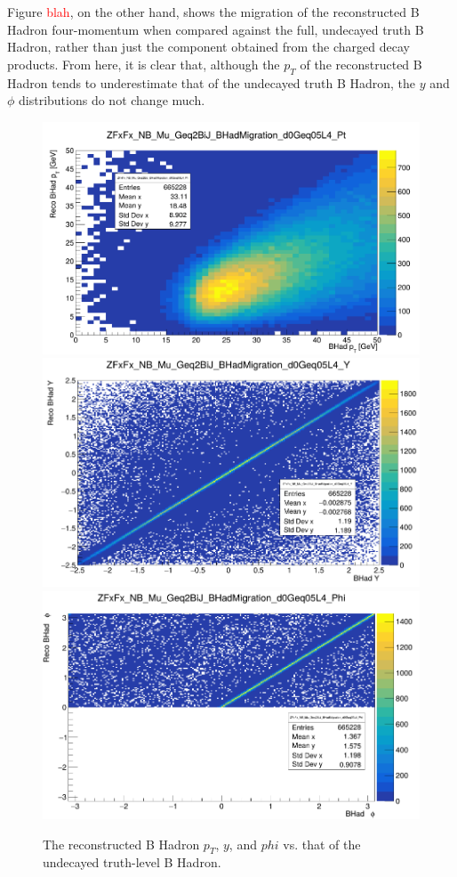 \documentclass[10pt,a4paper]{book}
\newcommand{\todo}[1]{{\textcolor{red}{#1}}}
\begin{document}
Figure \todo{blah}, on the other hand, shows the migration of the reconstructed B Hadron four-momentum when compared against the full, undecayed truth B Hadron, rather than just the component obtained from the charged decay products. From here, it is clear that, although the $p_T$ of the reconstructed B Hadron tends to underestimate that of the undecayed truth B Hadron, the $y$ and $\phi$ distributions do not change much.

\begin{figure}
    \centering
    \includegraphics[width=0.9\linewidth]{analysis-chapter/pflowMig_tot_pt.png}
    \includegraphics[width=0.9\linewidth]{analysis-chapter/pflowMig_tot_y.png}
    \includegraphics[width=0.9\linewidth]{analysis-chapter/pflowMig_tot_phi.png}
    \caption{The reconstructed B Hadron $p_T$, $y$, and $phi$ vs. that of the undecayed truth-level B Hadron.}
    \label{chargedMigration}
\end{figure}
\end{document}
